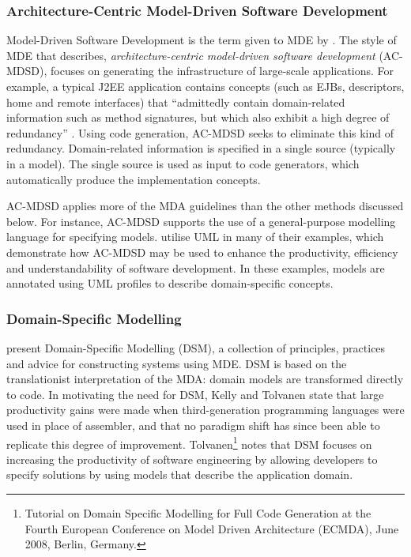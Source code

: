 \subsubsection{Architecture-Centric Model-Driven Software Development}
Model-Driven Software Development is the term given to MDE by \cite{stahl06mdsd}. The style of MDE that \cite{stahl06mdsd} describes, \textit{architecture-centric model-driven software development} (AC-MDSD), focuses on generating the infrastructure of large-scale applications. For example, a typical J2EE application contains concepts (such as EJBs, descriptors, home and remote interfaces) that ``admittedly contain domain-related information such as method signatures, but which also exhibit a high degree of redundancy'' \cite{stahl06mdsd}. Using code generation, AC-MDSD seeks to eliminate this kind of redundancy. Domain-related information is specified in a single source (typically in a model). The single source is used as input to code generators, which automatically produce the implementation concepts.

AC-MDSD applies more of the MDA guidelines than the other methods discussed below. For instance, AC-MDSD supports the use of a general-purpose modelling language for specifying models. \cite{stahl06mdsd} utilise UML in many of their examples, which demonstrate how AC-MDSD may be used to enhance the productivity, efficiency and understandability of software development. In these examples, models are annotated using UML profiles to describe domain-specific concepts.


\subsubsection{Domain-Specific Modelling}
\cite{kelly08dsm} present Domain-Specific Modelling (DSM), a collection of principles, practices and advice for constructing systems using MDE. DSM is based on the translationist interpretation of the MDA: domain models are transformed directly to code. In motivating the need for DSM, Kelly and Tolvanen state that large productivity gains were made when third-generation programming languages were used in place of assembler, and that no paradigm shift has since been able to replicate this degree of improvement. Tolvanen\footnote{Tutorial on Domain Specific Modelling for Full Code Generation at the Fourth European Conference on Model Driven Architecture (ECMDA), June 2008, Berlin, Germany.} notes that DSM focuses on increasing the productivity of software engineering by allowing developers to specify solutions by using models that describe the application domain.

